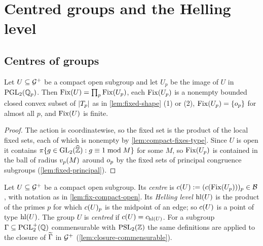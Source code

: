 \section{Centred groups and the Helling level}\label{sec:centring}

\subsection{Centres of groups}

\begin{lemma}\label{lem:fix-compact-open}
Let $U \subseteq \mathcal{G}^{+}$ be a compact open subgroup and let $U_p$ be
the image of $U$ in $\PGL{2}{\pAdicNumbers{p}}$. Then
$\mathrm{Fix}(U) = \prod_p \mathrm{Fix}(U_p)$, each $\mathrm{Fix}(U_p)$ is a nonempty
bounded closed convex subset of $|T_{p}|$ as in
\cref{lem:fixed-shape} (1) or (2), $\mathrm{Fix}(U_p) = \{o_{p}\}$
for almost all $p$, and $\mathrm{Fix}(U)$ is finite.
\end{lemma}

\begin{proof}
The action is coordinatewise, so the fixed set is the product of the
local fixed sets, each of which is nonempty by
\cref{lem:compact-fixes-type}. Since $U$ is open it contains
$\AdelicProjection\{g \in \GL{2}{\ProfiniteIntegers} : g \equiv 1 \bmod M\}$ for
some $M$, so $\mathrm{Fix}(U_p)$ is contained in the ball of radius
$v_{p}(M)$ around $o_{p}$ by the fixed sets of principal
congruence subgroups (\cref{lem:fixed-principal}).
\end{proof}

\begin{definition}\label{def:helling-level}
Let $U \subseteq \mathcal{G}^{+}$ be a compact open subgroup. Its
\emph{centre} is $c(U) := (c(\mathrm{Fix}(U_p)))_p \in \mathcal{B}$,
with notation as in \cref{lem:fix-compact-open}. Its \emph{Helling level}
$\operatorname{hl}(U)$ is the product of the primes $p$ for which
$c(U)_p$ is the midpoint of an edge; so $c(U)$ is a point of
type $\operatorname{hl}(U)$. The group $U$ is \emph{centred} if
$c(U) = c_{\operatorname{hl}(U)}$. For a subgroup
$\Gamma \subseteq \mathrm{PGL}_{2}^{+}(\mathbb{Q})$ commensurable with $\PSL{2}{\ZZ}$ the
same definitions are applied to the closure of $\widetilde{\Gamma}$ in
$\mathcal{G}^{+}$ (\cref{lem:closure-commensurable}).
\end{definition}

